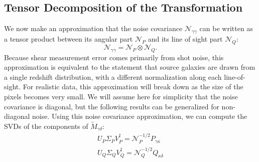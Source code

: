 \documentclass[twocolumn]{emulateapj}
\newcommand{\mymat}[1]{#1}
\begin{document}
\subsection{Tensor Decomposition of the Transformation}
We now make an approximation that the noise covariance 
$\mymat{\mathcal{N}}_{\gamma\gamma}$ can be written as a
tensor product between its angular part $\mymat{\mathcal{N}_P}$ 
and its line of sight part $\mymat{\mathcal{N}_Q}$:
\begin{equation}
  \label{noise_decomp}
  \mymat{\mathcal{N}}_{\gamma\gamma} 
  = \mymat{\mathcal{N}_P} \otimes \mymat{\mathcal{N}_Q}.
\end{equation}
Because shear measurement error comes primarily from shot noise, this 
approximation is equivalent to the statement that source galaxies are drawn 
from a single redshift distribution, with a different normalization along 
each line-of-sight.  For realistic data, this approximation will break down
as the size of the pixels becomes very small.  We will assume here for 
simplicity that the noise covariance is diagonal, but the following results
can be generalized for non-diagonal noise.  
Using this noise covariance approximation, we can compute the 
SVDs of the components of $\widetilde{M}_{\gamma\delta}$:
\begin{eqnarray}
  \mymat{U}_P\mymat{\Sigma}_P\mymat{V}_P^\dagger = \mathcal{N}_P^{-1/2} \mymat{P}_{\gamma\kappa}\nonumber\\
  \mymat{U}_Q\mymat{\Sigma}_Q\mymat{V}_Q^\dagger = \mathcal{N}_Q^{-1/2} \mymat{Q}_{\kappa\delta}
\end{eqnarray}
\end{document}

